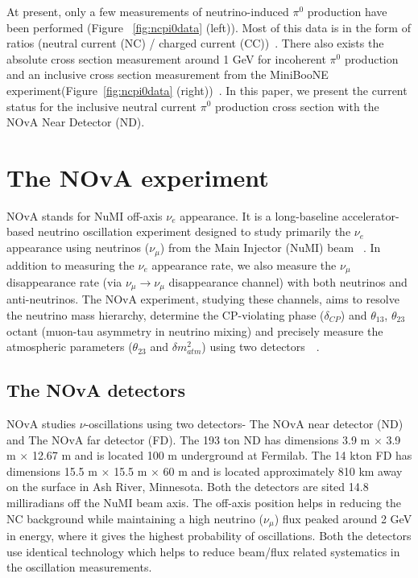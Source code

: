 \documentclass[12pt]{article}
\begin{document}
At present, only a few measurements of neutrino-induced $\pi^{0}$ production have been performed (Figure ~\ref{fig:ncpi0data} (left)). Most of this data is in the form of ratios (neutral current (NC) / charged current (CC))~\cite{Formaggio}. There also exists the absolute cross section measurement around 1 GeV for incoherent $\pi^{0}$ production and an inclusive cross section measurement from the MiniBooNE experiment(Figure~\ref{fig:ncpi0data} (right))~\cite{Arevalo}. In this paper, we present the current status for the inclusive neutral current  $\pi^{0}$ production cross section with the NOvA Near Detector (ND).


\section{The NOvA experiment}
NOvA stands for NuMI off-axis $\nu_{e}$ appearance. It is a long-baseline accelerator-based neutrino oscillation experiment designed to study primarily the $\nu_{e}$ appearance using neutrinos ($\nu_{\mu}$) from the Main Injector (NuMI) beam ~\cite{Adamson}. In addition to measuring the $\nu_{e}$ appearance rate, we also measure the $\nu_{\mu}$ disappearance rate (via $\nu_{\mu} \rightarrow \nu_{\mu}$ disappearance channel) with both neutrinos and anti-neutrinos. The NOvA experiment, studying these channels, aims to resolve the neutrino mass hierarchy, determine the CP-violating phase ($\delta_{CP}$) and $\theta_{13}$, $\theta_{23}$ octant (muon-tau asymmetry in neutrino mixing) and precisely measure the atmospheric parameters ($\theta_{23}$ and $\delta m^{2}_{atm}$) using two detectors~\cite{AdamsonI}~\cite{AdamsonII}.

\subsection{The NOvA detectors}
NOvA studies $\nu$-oscillations using two detectors- The NOvA near detector (ND) and The NOvA far detector (FD). The 193 ton ND has dimensions 3.9 m $\times$ 3.9 m $\times$ 12.67 m and is located 100 m underground at Fermilab. The 14 kton FD has dimensions 15.5 m $\times$ 15.5 m $\times$ 60 m and is located approximately 810 km away on the surface in Ash River, Minnesota. Both the detectors are sited 14.8 milliradians off the NuMI beam axis. The off-axis position helps in reducing the NC background while maintaining a high neutrino ($\nu_{\mu}$) flux peaked around 2 GeV in energy, where it gives the highest probability of oscillations. Both the detectors use identical technology which helps to reduce beam/flux related systematics in the oscillation measurements.
\end{document}
